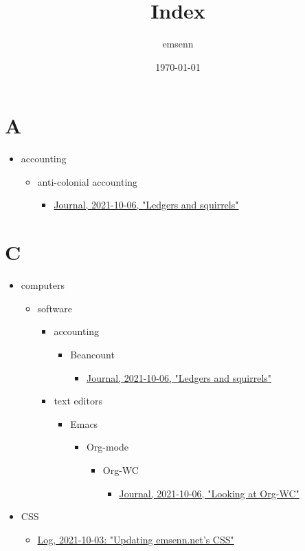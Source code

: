 \documentclass[11pt]{article}
\author{emsenn}
\date{\today}
\title{Index}
\begin{document}
\maketitle

\section*{A}
\label{sec:org7a533b8}
\begin{itemize}
\item accounting
\begin{itemize}
\item anti-colonial accounting
\begin{itemize}
\item \href{emsenn.org}{Journal, 2021-10-06, "Ledgers and squirrels"}
\end{itemize}
\end{itemize}
\end{itemize}
\section*{C}
\label{sec:org846f918}
\begin{itemize}
\item computers
\begin{itemize}
\item software
\begin{itemize}
\item accounting
\begin{itemize}
\item Beancount
\begin{itemize}
\item \href{emsenn.org}{Journal, 2021-10-06, "Ledgers and squirrels"}
\end{itemize}
\end{itemize}
\item text editors
\begin{itemize}
\item Emacs
\begin{itemize}
\item Org-mode
\begin{itemize}
\item Org-WC
\begin{itemize}
\item \href{emsenn.org}{Journal, 2021-10-06, "Looking at Org-WC"}
\end{itemize}
\end{itemize}
\end{itemize}
\end{itemize}
\end{itemize}
\end{itemize}
\item CSS
\begin{itemize}
\item \href{emsenn.org}{Log, 2021-10-03: "Updating emsenn.net's CSS"}
\end{itemize}
\end{itemize}
\end{document}
